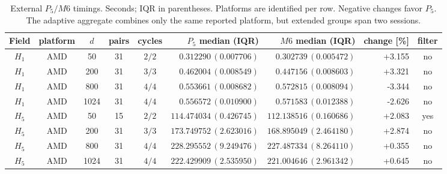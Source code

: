\begin{table}[htbp]
\centering\scriptsize
\setlength{\tabcolsep}{3pt}
\caption{External $P_5/M6$ timings. Seconds; IQR in parentheses. Platforms are identified per row. Negative changes favor $P_5$. The adaptive aggregate combines only the same reported platform, but extended groups span two sessions.}\label{tab:ext-external6}
\begin{tabular}{cccccrrrc}\toprule
Field & platform & $d$ & pairs & cycles & $P_5$ median (IQR) & $M6$ median (IQR) & change [\%] & filter\\\midrule
$H_1$ & AMD & 50 & 31 & $2/2$ & $0.312290\,(0.007706)$ & $0.302739\,(0.005472)$ & +3.155 & no\\
$H_1$ & AMD & 200 & 31 & $3/3$ & $0.462004\,(0.008549)$ & $0.447156\,(0.008603)$ & +3.321 & no\\
$H_1$ & AMD & 800 & 31 & $4/4$ & $0.553661\,(0.008682)$ & $0.572815\,(0.008094)$ & -3.344 & no\\
$H_1$ & AMD & 1024 & 31 & $4/4$ & $0.556572\,(0.010900)$ & $0.571583\,(0.012388)$ & -2.626 & no\\
$H_5$ & AMD & 50 & 15 & $2/2$ & $114.474034\,(0.426745)$ & $112.138516\,(0.160686)$ & +2.083 & yes\\
$H_5$ & AMD & 200 & 31 & $3/3$ & $173.749752\,(2.623016)$ & $168.895049\,(2.464180)$ & +2.874 & no\\
$H_5$ & AMD & 800 & 31 & $4/4$ & $228.295552\,(9.249476)$ & $227.487334\,(8.264110)$ & +0.355 & no\\
$H_5$ & AMD & 1024 & 31 & $4/4$ & $222.429909\,(2.535950)$ & $221.004646\,(2.961342)$ & +0.645 & no\\
\bottomrule\end{tabular}
\end{table}
\FloatBarrier
